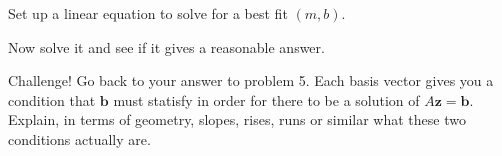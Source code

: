 \documentclass[minion]{homework}
\def\vz{\mathbf{z}}
\def\vb{\mathbf{b}}
\begin{document}
\begin{aproblems}
\aproblem Set up a linear equation to solve for a best fit $(m,b)$.

\aproblem Now solve it and see if it gives a reasonable answer.

\aproblem Challenge! Go back to your answer to problem 5.  Each
basis vector gives you a condition that $\vb$ must statisfy in
order for there to be a solution of $A\vz =\vb$.  Explain, in
terms of geometry, slopes, rises, runs or similar what these two
conditions actually are.

\end{aproblems}
\end{document}
